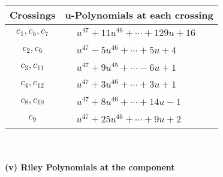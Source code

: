 \documentclass[1p]{elsarticle_modified}
\theoremstyle{definition}
\begin{document}
\begin{tabular}{m{50pt}|m{274pt}}
Crossings & \hspace{64pt}u-Polynomials at each crossing \\
\hline $$\begin{aligned}c_{1},c_{5},c_{7}\end{aligned}$$&$\begin{aligned}
&u^{47}+11 u^{46}+\cdots+129 u+16
\end{aligned}$\\
\hline $$\begin{aligned}c_{2},c_{6}\end{aligned}$$&$\begin{aligned}
&u^{47}-5 u^{46}+\cdots+5 u+4
\end{aligned}$\\
\hline $$\begin{aligned}c_{3},c_{11}\end{aligned}$$&$\begin{aligned}
&u^{47}+9 u^{45}+\cdots-6 u+1
\end{aligned}$\\
\hline $$\begin{aligned}c_{4},c_{12}\end{aligned}$$&$\begin{aligned}
&u^{47}+3 u^{46}+\cdots+3 u+1
\end{aligned}$\\
\hline $$\begin{aligned}c_{8},c_{10}\end{aligned}$$&$\begin{aligned}
&u^{47}+8 u^{46}+\cdots+14 u-1
\end{aligned}$\\
\hline $$\begin{aligned}c_{9}\end{aligned}$$&$\begin{aligned}
&u^{47}+25 u^{46}+\cdots+9 u+2
\end{aligned}$\\
\hline
\end{tabular}\\~\\
\newpage\renewcommand{\arraystretch}{1}
\flushleft \textbf{(v) Riley Polynomials at the component}\newline \\
\end{document}
